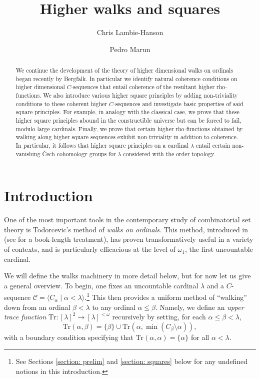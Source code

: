 \documentclass{amsart}
\title{Higher walks and squares}
\author{Chris Lambie-Hanson}
\author{Pedro Marun}
\numberwithin{theorem}{section}
\theoremstyle{definition}
\newcommand{\mc}{\mathcal}
\newcommand{\ra}{\rightarrow}
\newcommand{\Tr}{\mathrm{Tr}}
\begin{document}
\begin{abstract}
We continue the development of the theory of higher dimensional walks on ordinals began recently by Bergfalk. In particular we identify natural coherence conditions on higher dimensional $C$-sequences that entail coherence of the resultant higher rho-functions. We also introduce various higher square principles by adding non-triviality conditions to these coherent higher $C$-sequences and investigate basic properties of said square principles. For example, in analogy with the classical case, we prove that these higher square principles abound in the constructible universe but can be forced to fail, modulo large cardinals. Finally, we prove that certain higher rho-functions obtained by walking along higher square sequences exhibit non-triviality in addition to coherence. In particular, it follows that higher square principles on a cardinal $\lambda$ entail certain non-vanishing \v{C}ech cohomology groups for $\lambda$ considered with the order topology.
\end{abstract}
\maketitle


\section{Introduction}

One of the most important tools in the contemporary study of combinatorial set theory 
is Todorcevic's method of \emph{walks on ordinals}. This method, introduced in 
\cite{todorcevic_countable} (see \cite{todorcevic_walks_book} for a book-length treatment), 
has proven transformatively useful in a variety of contexts, and is particularly efficacious 
at the level of $\omega_1$, the first uncountable cardinal.

We will define the walks machinery in more detail below, but for now let us give a general overview. 
To begin, one fixes an uncountable cardinal $\lambda$ and a $C$-sequence 
$\mc{C} = \langle C_\alpha \mid \alpha < \lambda \rangle$.\footnote{See Sections \ref{section: prelim} and \ref{section: squares} below for any undefined notions in this introduction.} 
This then provides a uniform 
method of ``walking'' down from an ordinal $\beta < \lambda$ to any ordinal $\alpha \leq \beta$. 
Namely, we define an \emph{upper trace function} $\Tr : [\lambda]^2 \ra [\lambda]^{<\omega}$ 
recursively by setting, for each $\alpha \leq \beta < 
\lambda$,
\[
  \Tr(\alpha,\beta) = \{\beta\} \cup \Tr(\alpha, \min(C_\beta \setminus \alpha)),
\]
with a boundary condition specifying that $\Tr(\alpha,\alpha) = \{\alpha\}$ for all 
$\alpha < \lambda$. 
\end{document}
